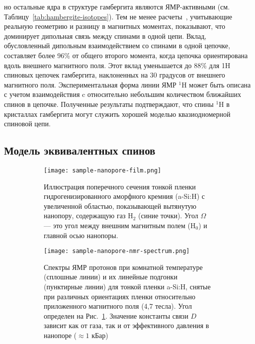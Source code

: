 но остальные ядра в структуре гамбергита являются ЯМР-активными (см. Таблицу~\ref{tab:hambergite-isotopes}).
Тем не менее расчеты~\cite{Bochkin2020jmr},
учитывающие реальную геометрию и разницу в магнитных моментах,
показывают, что доминирует дипольная связь между спинами в одной цепи.
Вклад, обусловленный дипольным взаимодействием со спинами в одной цепочке, составляет более 96\% от общего второго момента,
когда цепочка ориентирована вдоль внешнего магнитного поля.
Этот вклад уменьшается до 88\% для 1H спиновых цепочек гамбергита,
наклоненных на 30 градусов от внешнего магнитного поля.
Экспериментальная форма линии ЯМР $^1$H может быть описана
с учетом взаимодействия c относительно небольшим количеством ближайших спинов в цепочке.
Полученные результаты подтверждают,
что спины $^1$H в кристаллах гамбергита могут служить хорошей моделью квазиодномерной спиновой цепи.


\subsection{Модель эквивалентных спинов}
\label{sec:model-equivalent-spins}
\begin{figure}[H]
  \begin{subfigure}[t]{0.55\textwidth}
    \centering
    \texttt{[image: sample-nanopore-film.png]}
    \caption{
      Иллюстрация поперечного сечения тонкой пленки гидрогенизированного аморфного кремния (a-Si:H) с увеличенной областью,
      показывающей вытянутую нанопору,
      содержащую газ H$_2$ (синие точки).
      Угол $\Omega$ --- это угол между внешним магнитным полем (H$_0$) и главной осью нанопоры.
    }
    \label{fig:sample-nanopore-film}
  \end{subfigure}
  \hfill
  \begin{subfigure}[t]{0.4\textwidth}
    \centering
    \texttt{[image: sample-nanopore-nmr-spectrum.png]}
    \caption{
      Спектры ЯМР протонов при комнатной температуре (сплошные линии)
      и их линейные подгонки (пунктирные линии)
      для тонкой пленки a-Si:H,
      снятые при различных ориентациях пленки относительно приложенного магнитного поля (4,7 тесла).
      Угол определен на  Рис.~\ref{fig:sample-nanopore-film}.
      Значение константы связи $D$ зависит как от газа,
      так и от эффективного давления в нанопоре ($\approx 1$ кБар)
    }
    \label{fig:sample-nanopore-nmr-spectrum}
  \end{subfigure}
  \caption{}
\end{figure}


